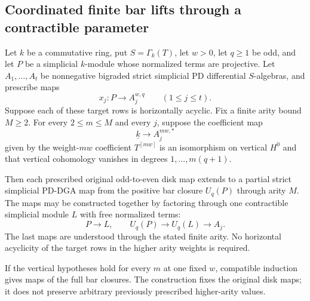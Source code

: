\subsection{Coordinated finite bar lifts through a contractible parameter}

\begin{theorem}
\label{sa08:C28}
Let $k$ be a commutative ring, put $S=\Gamma_k(T)$, let
$w>0$, let $q\geq1$ be odd, and let
$P$ be a simplicial $k$-module whose normalized terms are
projective. Let $A_1,\ldots,A_t$ be nonnegative bigraded
strict simplicial PD differential $S$-algebras, and prescribe maps
\[
 x_j\colon P\longrightarrow A_j^{w,q}
 \qquad(1\leq j\leq t).
\]
Suppose each of these target rows is horizontally acyclic.
Fix a finite arity bound $M\geq2$. For every $2\leq m\leq M$
and every $j$, suppose the coefficient map
\[
 \underline{k}\longrightarrow A_j^{mw,*}
\]
given by the weight-$mw$ coefficient $T^{[mw]}$
is an isomorphism on vertical $H^0$ and that vertical cohomology
vanishes in degrees $1,\ldots,m(q+1)$.

Then each prescribed original odd-to-even disk map extends
to a partial strict simplicial PD-DGA map from the positive
bar closure $U_q(P)$ through arity $M$. The maps may be
constructed together by factoring through one contractible
simplicial module $L$ with free normalized terms:
\[
 P\longrightarrow L,\qquad
 U_q(P)\longrightarrow U_q(L)\longrightarrow A_j.
\]
The last maps are understood through the stated finite arity.
No horizontal acyclicity of the target rows in the higher
arity weights is required.

If the vertical hypotheses hold for every $m$ at one fixed
$w$, compatible induction gives maps of the full bar closures.
The construction fixes the original disk maps; it does not
preserve arbitrary previously prescribed higher-arity values.
\end{theorem}
